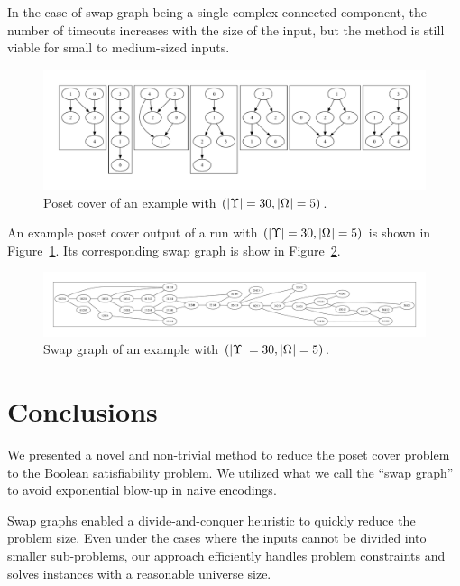 \documentclass[12pt]{llncs}
\DeclarePairedDelimiter{\abs}{\lvert}{\rvert}
\newcommand{\uni}[1][]{\Omega_{#1}}
\begin{document}
In the case of swap graph being a single complex connected component, the number of timeouts increases with the size of the input, but the method is still viable for small to medium-sized inputs.

\begin{figure}[h]
    \centering
    \includegraphics[width=0.9\linewidth]{cover_example}
    \caption{Poset cover of an example with $(\abs{\Upsilon} = 30, \abs{\uni} = 5)$.}
    \label{figure:cover_exp}
\end{figure}

An example poset cover output of a run with $(\abs{\Upsilon} = 30, \abs{\uni} = 5)$ is shown in Figure~\ref{figure:cover_exp}. Its corresponding swap graph is show in Figure~\ref{figure:swap_exp}.

\begin{figure}[h]
    \centering
    \includegraphics[width=0.9\linewidth]{swap_graph_example}
    \caption{Swap graph of an example with $(\abs{\Upsilon} = 30, \abs{\uni} = 5)$.}
    \label{figure:swap_exp}
\end{figure}

\section{Conclusions}

We presented a novel and non-trivial method to reduce the poset cover problem to the Boolean satisfiability problem. We utilized what we call the ``swap graph'' to avoid exponential blow-up in naive encodings.

Swap graphs enabled a divide-and-conquer heuristic to quickly reduce the problem size. Even under the cases where the inputs cannot be divided into smaller sub-problems, our approach efficiently handles problem constraints and solves instances with a reasonable universe size.
\end{document}
